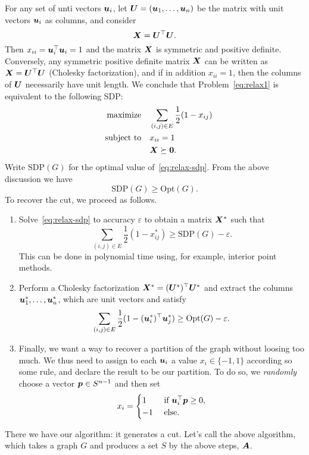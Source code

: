 For any set of unti vectors $\bm{u}_i$, let $\bm{U}=(\bm{u}_1,\dots,\bm{u}_n)$ be the matrix with unit vectors $\bm{u}_i$ as columns, and consider
\begin{equation*}
 \bm{X}=\bm{U}^{\top}\bm{U}.
\end{equation*}
Then $x_{ii}=\bm{u}_i^{\top}\bm{u}_i=1$ and the matrix $\bm{X}$ is symmetric and positive definite.
Conversely, any symmetric positive definite matrix $\bm{X}$ can be written as $\bm{X}=\bm{U}^{\top}\bm{U}$ (Cholesky factorization), and if in addition $x_{ii}=1$, then the columns of $\bm{U}$ necessarily have unit length. We conclude that Problem~\eqref{eq:relax1} is equivalent to the following SDP:
\begin{align}\label{eq:relax-sdp}
\begin{split}
\text{maximize}\quad & \sum_{(i,j)\in E} \frac{1}{2}(1-x_{ij})\\
\quad\text{subject to}\quad & x_{ii}=1\\
& \bm{X}\succeq \bm{0}.
\end{split}
\end{align}
Write $\mathrm{SDP}(G)$ for the optimal value of~\eqref{eq:relax-sdp}. From the above discussion we have
\begin{equation*}
 \mathrm{SDP}(G)\geq \mathrm{Opt}(G).
\end{equation*}
To recover the cut, we proceed as follows.
\begin{enumerate}
 \item Solve~\eqref{eq:relax-sdp} to accuracy $\varepsilon$ to obtain a matrix $\bm{X}^*$ such that
 \begin{equation*}
  \sum_{(i,j)\in E} \frac{1}{2}(1-x_{ij}^*) \geq \mathrm{SDP}(G)-\varepsilon.
 \end{equation*}
 This can be done in polynomial time using, for example, interior point methods.
\item Perform a Cholesky factorization $\bm{X}^*=(\bm{U}^*)^{\top}\bm{U}^*$ and extract the columns
$\bm{u}_1^*,\dots,\bm{u}_n^*$, which are unit vectors and satisfy
\begin{equation*}
 \sum_{(i,j)\in E} \frac{1}{2}(1-(\bm{u}_i^*)^{\top}\bm{u}_j^*)\geq \mathrm{Opt}(G)-\varepsilon.
\end{equation*}
\item Finally, we want a way to recover a partition of the graph without loosing too much. We thus need to assign to each $\bm{u}_i$ a value $x_i\in \{-1,1\}$ according so some rule, and declare the result to be our partition. To do so, we {\em randomly} choose a vector $\bm{p}\in S^{n-1}$ and then set
\begin{equation*}
 x_i = \begin{cases}
        1 & \text{ if } \bm{u}_i^{\top}\bm{p} \geq 0,\\
        -1 & \text{ else.}
       \end{cases}
\end{equation*}
\end{enumerate}
There we have our algorithm: it generates a cut. Let's call the above algorithm, which takes a graph $G$ and produces a set $S$ by the above steps, $\bm{A}$.

